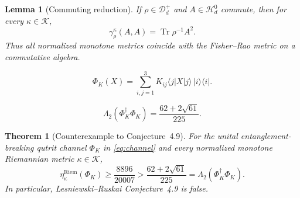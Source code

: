 \documentclass[10pt,a4paper]{amsart}
\newtheorem{lemma}{Lemma}
\newtheorem{theorem}{Theorem}
\newcommand{\Dplus}{\mathcal D_d^{+}}
\newcommand{\Htr}{\mathcal H_d^{0}}
\newcommand{\PhiK}{\Phi_K}
\newcommand{\Riem}{\mathrm{Riem}}
\DeclareMathOperator{\Tr}{Tr}
\begin{document}
\begin{lemma}[Commuting reduction]\label{lem:commuting}
If $\rho\in\Dplus$ and $A\in\Htr$ commute, then for every $\kappa\in\mathcal K$,
\begin{equation}\label{eq:fisher}
 \gamma_\rho^\kappa(A,A)=\Tr \rho^{-1}A^2.
\end{equation}
Thus all normalized monotone metrics coincide with the Fisher--Rao metric on a commutative algebra.
\end{lemma}

\begin{equation}\label{eq:channel}
 \PhiK(X)
 =\sum_{i,j=1}^3
 K_{ij}\langle j|X|j\rangle\,|i\rangle\langle i|.
\end{equation}

\begin{equation}\label{eq:spectralvalue}
 \Lambda_2(\PhiK^\dagger\PhiK)
 =\frac{62+2\sqrt{61}}{225}.
\end{equation}

\begin{theorem}[Counterexample to Conjecture~4.9]\label{thm:main}
For the unital entanglement-breaking qutrit channel $\PhiK$ in \eqref{eq:channel} and every normalized monotone Riemannian metric $\kappa\in\mathcal K$,
\begin{equation}\label{eq:mainineq}
 \eta_\kappa^{\Riem}(\PhiK)
 \ge \frac{8896}{20007}
 >\frac{62+2\sqrt{61}}{225}
 =\Lambda_2(\PhiK^\dagger\PhiK).
\end{equation}
In particular, Lesniewski--Ruskai Conjecture~4.9 is false.
\end{theorem}
\end{document}
